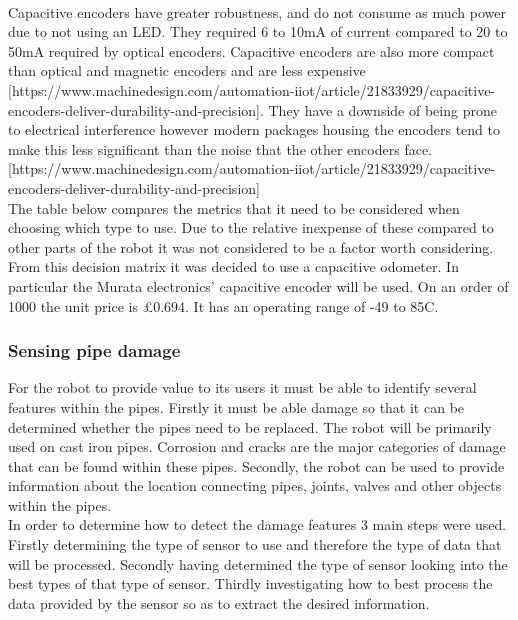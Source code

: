 \documentclass[11pt]{article}		%
\begin{document}
        \\
        Capacitive encoders have greater robustness, and do not consume as much power due to not using an LED. 
        They required 6 to 10mA of current compared to 20 to 50mA required by optical encoders.
        Capacitive encoders are also more compact than optical and magnetic encoders and are less expensive [https://www.machinedesign.com/automation-iiot/article/21833929/capacitive-encoders-deliver-durability-and-precision]. 
        They have a downside of being prone to electrical interference however modern packages housing the encoders tend to make this less significant than the noise that the other encoders face. [https://www.machinedesign.com/automation-iiot/article/21833929/capacitive-encoders-deliver-durability-and-precision]
        \\
        The table below compares the metrics that it need to be considered when choosing which type to use. 
        Due to the relative inexpense of these compared to other parts of the robot it was not considered to be a factor worth considering. 
        From this decision matrix it was decided to use a capacitive odometer. 
        In particular the Murata electronics’ capacitive encoder will be used. 
        On an order of 1000 the unit price is £0.694. 
        It has an operating range of -49 to 85C.

        \subsubsection{Sensing pipe damage}
        
        For the robot to provide value to its users it must be able to identify several features within the pipes. 
        Firstly it must be able damage so that it can be determined whether the pipes need to be replaced.
        The robot will be primarily used on cast iron pipes. 
        Corrosion and cracks are the major categories of damage that can be found within these pipes.    
        Secondly, the robot can be used to provide information about the location connecting pipes, joints, valves and other objects within the pipes.
        \\
        In order to determine how to detect the damage features 3 main steps were used. 
        Firstly determining the type of sensor to use and therefore the type of data that will be processed. 
        Secondly having determined the type of sensor looking into the best types of that type of sensor. 
        Thirdly investigating how to best process the data provided by the sensor so as to extract the desired information.
        
\end{document}
